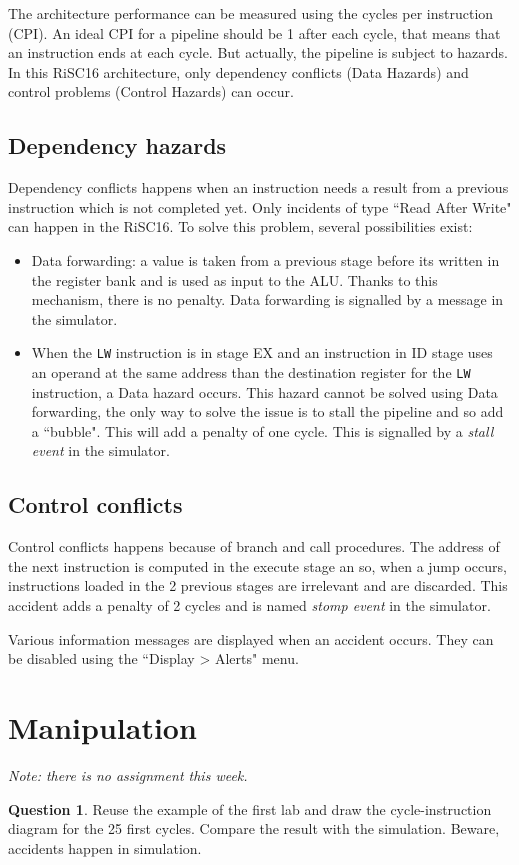 \documentclass[10pt,a4paper]{article}
\theoremstyle{definition}%
\newtheorem{Q}{Question}[] %
\begin{document}
The architecture performance can be measured using the cycles per instruction (CPI).
%
An ideal CPI for a pipeline should be 1 after each cycle, that means that an instruction ends at each cycle.
%
But actually, the pipeline is subject to hazards. In this RiSC16 architecture, only dependency conflicts (Data Hazards) and control problems (Control Hazards) can occur.

\subsection{Dependency hazards}
Dependency conflicts happens when an instruction needs a result from a previous instruction which is not completed yet. Only incidents of type ``Read After Write" can happen in the RiSC16.
To solve this problem, several possibilities exist:
\begin{itemize}
\item Data forwarding: a value is taken from a previous stage before its written in the register bank and is used as input to the ALU. Thanks to this mechanism, there is no penalty. Data forwarding is signalled by a message in the simulator.
\item When the \verb!LW! instruction is in stage EX and an instruction in ID stage uses an operand at the same address than the destination register for the \verb!LW! instruction, a Data hazard occurs. This hazard cannot be solved using Data forwarding, the only way to solve the issue is to stall the pipeline and so add a ``bubble". This will add a penalty of one cycle. This is signalled by a \textit{stall event} in the simulator.
\end{itemize}

\subsection{Control conflicts}
Control conflicts happens because of branch and call procedures. The address of the next instruction is computed in the execute stage an so, when a jump occurs, instructions loaded in the 2 previous stages are irrelevant and are discarded. This accident adds a penalty of 2 cycles and is named \textit{stomp event} in the simulator.

Various information messages are displayed when an accident occurs. They can be disabled using the ``Display > Alerts" menu.

\section{Manipulation}
\textit{Note: there is no assignment this week.}
\begin{Q}
Reuse the example of the first lab and draw the cycle-instruction diagram for the 25 first cycles. Compare the result with the simulation. Beware, accidents happen in simulation.
\end{Q}
\end{document}
